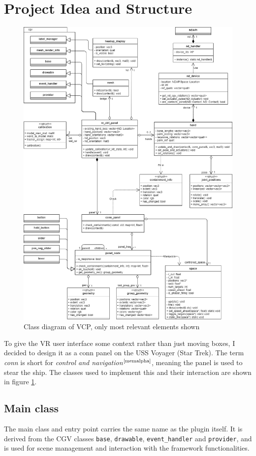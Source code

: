\documentclass[hyperref, bachelorofscience]{cgvpub}
\newcommand{\newcite}[1]{$ ^{\text{\cite{#1}}} $}
\begin{document}
\section{Project Idea and Structure}
\begin{figure}
	\includegraphics[width=\linewidth]{../pics/uml}
	\caption[Class diagram of \gls{VCP}]{Class diagram of \gls{VCP}, only most relevant elements shown}
	\label{fig:uml}
\end{figure}

To give the VR user interface some context rather than just moving boxes, I decided to design it as a conn panel on the USS Voyager (Star Trek). The term \emph{conn} is short for \emph{control and navigation}\newcite{memalpha}, meaning the panel is used to stear the ship. The classes used to implement this and their interaction are shown in figure \ref{fig:uml}.

\subsection{Main class}
The main class and entry point carries the same name as the plugin itself. It is derived from the \gls{CGV} classes \lstinline|base|, \lstinline|drawable|, \lstinline|event_handler| and \lstinline|provider|, and is used for scene management and interaction with the framework functionalities.
\end{document}
